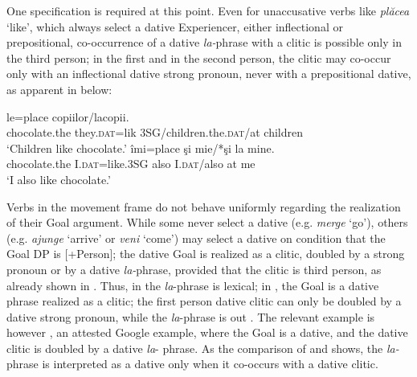 \documentclass[output=paper,colorlinks,citecolor=brown,nonflat]{./langscibook}
\begin{document}
One specification is required at this point. Even for unaccusative verbs like \textit{plăcea} ‘like’, which always select a dative Experiencer, either inflectional or prepositional, co-occurrence of a dative \textit{la-}phrase with a clitic is possible only in the third person; in the first and in the second person, the clitic may co-occur only with an inflectional dative strong pronoun, never with a prepositional dative, as apparent in  below:

\ea%
    \label{ex:cornilescu:10}
    \ea
     {le=place}  {copiilor}/{la}{copii}. 	\\
    	chocolate.the  they.\textsc{dat}=lik 3SG/children.the.\textsc{dat}/at children	\\  	
    \glt‘Children like chocolate.’
    \ex \label{ex:cornilescu:10b}
     {îmi=place} {şi} {mie}/*şi {la} mine.\\
    	chocolate.the  I.\textsc{dat}=like.3SG also I.\textsc{dat}/also at me\\
    \glt ‘I also like chocolate.’  
    \z 
    \z
    
Verbs in the movement frame do not behave uniformly regarding the realization of their Goal argument. While some never select a dative (e.g. \textit{merge} ‘go’), others (e.g. \textit{ajunge} ‘arrive’ or \textit{veni} ‘come’) may select a dative on condition that the Goal DP is [+Person]; the dative Goal is realized as a clitic, doubled by a strong pronoun or by a dative \textit{la-}phrase, provided that the clitic is third person, as already shown in . Thus, in  the \textit{la}-phrase is lexical; in , the Goal is a dative phrase realized as a clitic; the first person dative clitic can only be doubled by a dative strong pronoun, while the \textit{la}{}-phrase is out . The relevant example is however , an attested Google example, where the Goal is a dative, and the dative clitic is doubled by a dative \textit{la}{}- phrase. As the comparison of  and  shows, the \textit{la-}phrase is interpreted as a dative only when it co-occurs with a dative clitic. 
\end{document}
